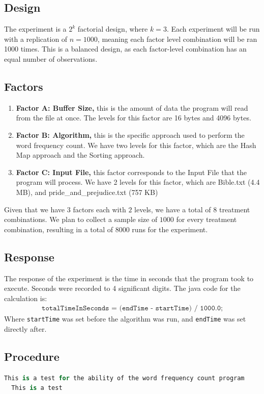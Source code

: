 \documentclass{article}
\begin{document}
\subsection*{Design}
The experiment is a $2^k$ factorial design, where $k=3$.
Each experiment will be run with a replication of $n=1000$,
meaning each factor level combination will be ran 1000 times.
This is a balanced design, as each factor-level
combination has an equal number of observations.

\subsection*{Factors}
\begin{enumerate}
  \item \textbf{Factor A: Buffer Size,} this is the amount of data the program will read from the file at once. The levels for this factor are 16 bytes and 4096 bytes.
  \item \textbf{Factor B: Algorithm,} this is the specific approach used to perform the word frequency count. We have two levels for this factor, which are the Hash Map approach and the Sorting approach.
  \item \textbf{Factor C: Input File,} this factor corresponds to the Input File that the program will process. We have 2 levels for this factor, which are Bible.txt (4.4 MB), and pride\_and\_prejudice.txt (757 KB)
\end{enumerate}

Given that we have $3$ factors each with $2$ levels,
we have a total of $8$ treatment combinations.
We plan to collect a sample size of $1000$ for every treatment combination,
resulting in a total of $8000$ runs for the experiment.

\subsection*{Response}
The response of the experiment is the time in seconds that the program took to execute.
Seconds were recorded to 4 significant digits. The java code for the calculation is:
\begin{align*}
  \texttt{totalTimeInSeconds = (endTime - startTime) / 1000.0;}
\end{align*}
Where \texttt{startTime} was set before the algorithm was run, and \texttt{endTime} was set directly after.

\subsection*{Procedure}
\begin{lstlisting}[language=Python, 
  basicstyle=\ttfamily\scriptsize, 
  numbers=none, 
  frame=single,
  showspaces=false,
  caption={A Sample test.txt file.}]
  This is a test for the ability of the word frequency count program
  This is a test
\end{lstlisting}
\end{document}
